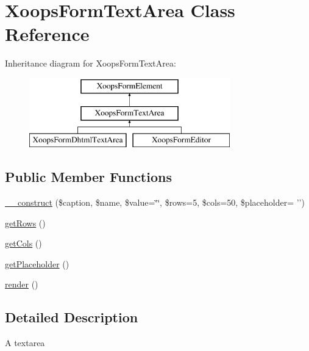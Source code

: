 \hypertarget{class_xoops_form_text_area}{\section{Xoops\-Form\-Text\-Area Class Reference}
\label{class_xoops_form_text_area}
}
Inheritance diagram for Xoops\-Form\-Text\-Area\-:\begin{figure}[H]
\begin{center}
\leavevmode
\includegraphics[height=3.000000cm]{class_xoops_form_text_area}
\end{center}
\end{figure}
\subsection*{Public Member Functions}
\begin{DoxyCompactItemize}
\item 
\hyperlink{class_xoops_form_text_area_ac3572b26bcc273adce3550d9c9e4dd8d}{\-\_\-\-\_\-construct} (\$caption, \$name, \$value=\char`\"{}\char`\"{}, \$rows=5, \$cols=50, \$placeholder= '')
\item 
\hyperlink{class_xoops_form_text_area_af43191b529ee3fa9ba3099fef05b6491}{get\-Rows} ()
\item 
\hyperlink{class_xoops_form_text_area_a89616ed4cd1c6cf4137e4c5f8bbb5adb}{get\-Cols} ()
\item 
\hyperlink{class_xoops_form_text_area_a1fa27fdb9f325e2e26adb161d203b9d6}{get\-Placeholder} ()
\item 
\hyperlink{class_xoops_form_text_area_a16a3f7e929bfa2e2b067928a81e76034}{render} ()
\end{DoxyCompactItemize}


\subsection{Detailed Description}
A textarea 


